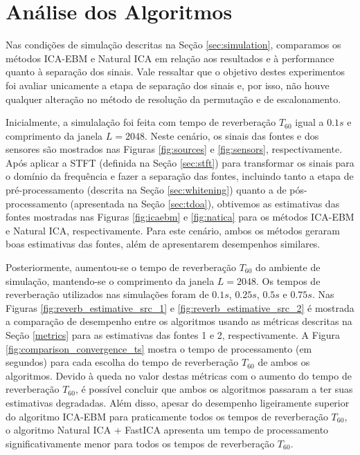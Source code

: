  \section{Análise dos Algoritmos}\label{sec:analysis}
    
    Nas condições de simulação descritas na Seção \ref{sec:simulation}, comparamos os métodos ICA-EBM e Natural ICA em relação aos resultados e à performance quanto à separação dos sinais. Vale ressaltar que o objetivo destes experimentos foi avaliar unicamente a etapa de separação dos sinais e, por isso, não houve qualquer alteração no método de resolução da permutação e de escalonamento. 
    
    Inicialmente, a simulalação foi feita com tempo de reverberação $T_{60}$ igual a $0.1s$ e comprimento da janela $L=2048$. Neste cenário, os sinais das fontes e dos sensores são mostrados nas Figuras \ref{fig:sources} e \ref{fig:sensors}, respectivamente. Após aplicar a STFT (definida na Seção \ref{sec:stft}) para transformar os sinais para o domínio da frequência e fazer a separação das fontes, incluindo tanto a etapa de pré-processamento (descrita na Seção \ref{sec:whitening}) quanto a de pós-processamento (apresentada na Seção \ref{sec:tdoa}), obtivemos as estimativas das fontes mostradas nas Figuras \ref{fig:icaebm} e \ref{fig:natica} para os métodos ICA-EBM e Natural ICA, respectivamente. Para este cenário, ambos os métodos geraram boas estimativas das fontes, além de apresentarem desempenhos similares.
    
    Posteriormente, aumentou-se o tempo de reverberação $T_{60}$ do ambiente de simulação, mantendo-se o comprimento da janela $L=2048$. Os tempos de reverberação utilizados nas simulações foram de $0.1s$, $0.25s$, $0.5s$ e $0.75s$. Nas Figuras \ref{fig:reverb_estimative_src_1} e \ref{fig:reverb_estimative_src_2} é mostrada a comparação de desempenho entre os algoritmos usando as métricas descritas na Seção \ref{metrics} para as estimativas das fontes 1 e 2, respectivamente. A Figura \ref{fig:comparison_convergence_ts} mostra o tempo de processamento (em segundos) para cada escolha do tempo de reverberação $T_{60}$ de ambos os algoritmos. Devido à queda no valor destas métricas com o aumento do tempo de reverberação $T_{60}$, é possível concluir que ambos os algoritmos passaram a ter suas estimativas degradadas. Além disso, apesar do desempenho ligeiramente superior do algoritmo ICA-EBM para praticamente todos os tempos de reverberação $T_{60}$, o algoritmo Natural ICA + FastICA apresenta um tempo de processamento significativamente menor para todos os tempos de reverberação $T_{60}$.
    
